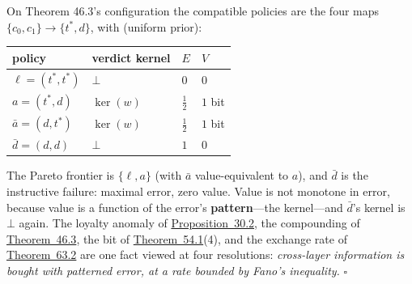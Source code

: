 \begin{thmplain}

On Theorem 46.3's configuration the compatible policies are the four maps \(\{c_0, c_1\} \to \{t^*, d\}\), with (uniform prior):

{\def\LTcaptype{none} %
\begin{longtable}[]{@{}
  >{\raggedright\arraybackslash}p{}
  >{\raggedright\arraybackslash}p{}
  >{\raggedright\arraybackslash}p{}
  >{\raggedright\arraybackslash}p{}@{}}
\toprule\noalign{}
\begin{minipage}[b]{\linewidth}\raggedright
policy
\end{minipage} & \begin{minipage}[b]{\linewidth}\raggedright
verdict kernel
\end{minipage} & \begin{minipage}[b]{\linewidth}\raggedright
\(E\)
\end{minipage} & \begin{minipage}[b]{\linewidth}\raggedright
\(V\)
\end{minipage} \\
\midrule\noalign{}
\endhead
\bottomrule\noalign{}
\endlastfoot
\(\ell = (t^*, t^*)\) & \(\bot\) & \(0\) & \(0\) \\
\(a = (t^*, d)\) & \(\ker(w)\) & \(\tfrac12\) & \(1\) bit \\
\(\bar a = (d, t^*)\) & \(\ker(w)\) & \(\tfrac12\) & \(1\) bit \\
\(\bar d = (d, d)\) & \(\bot\) & \(1\) & \(0\) \\
\end{longtable}
}

The Pareto frontier is \(\{\ell, a\}\) (with \(\bar a\) value-equivalent to \(a\)), and \(\bar d\) is the instructive failure: maximal error, zero value. Value is not monotone in error, because value is a function of the error's \textbf{pattern}---\hspace{0pt}the kernel---\hspace{0pt}and \(\bar d\)'s kernel is \(\bot\) again. The loyalty anomaly of \hyperlink{stmt:30.2}{Proposition~30.2}, the compounding of \hyperlink{stmt:46.3}{Theorem~46.3}, the bit of \hyperlink{stmt:54.1}{Theorem~54.1}(4), and the exchange rate of \hyperlink{stmt:63.2}{Theorem~63.2} are one fact viewed at four resolutions: \emph{cross-layer information is bought with patterned error, at a rate bounded by Fano's inequality.} \(\square\)
\end{thmplain}


